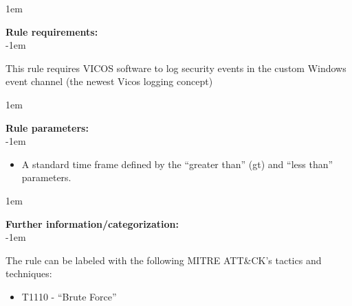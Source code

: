 \openup 1em

{\bf Rule requirements:} \\

\openup -1em
\vspace{-2em}

This rule requires VICOS software to log security events in the custom Windows event channel (the newest Vicos logging concept)

\openup 1em

{\bf Rule parameters:} \\

\openup -1em
\vspace{-2em}

\begin{itemize}
	\item A standard time frame defined by the ``greater than'' (gt) and ``less than'' parameters.
\end{itemize}

\openup 1em

{\bf Further information/categorization:} \\

\openup -1em
\vspace{-2em}


The rule can be labeled with the following MITRE ATT\&CK's tactics and techniques:
\begin{itemize}
	\item T1110 - ``Brute Force''
\end{itemize}

\pagebreak

